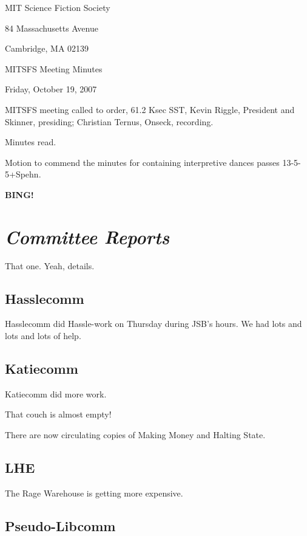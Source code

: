 \documentclass[10pt]{article}
\newcommand{\bing}{{\bf BING!} }
\newcommand{\goto}[1]{\bing \vskip 12pt \section*{{\em{#1}}}}
\begin{document}
\begin{center}

MIT Science Fiction Society

84 Massachusetts Avenue

Cambridge, MA 02139

\vspace{12pt}

MITSFS Meeting Minutes

Friday, October 19, 2007

\end{center}

\vspace{18pt}

\setlength{\parskip}{6pt}

\noindent
MITSFS meeting called to order, 61.2 Ksec SST,
Kevin Riggle, President and Skinner, presiding; Christian Ternus, Onseck, recording.

Minutes read.

Motion to commend the minutes for containing interpretive dances passes 13-5-5+Spehn.

\BING

\goto{Committee Reports}

That one.  Yeah, details.

\subsection*{Hasslecomm}

Hasslecomm did Hassle-work on Thursday during JSB's hours.  We had lots and lots and lots of help.

\subsection*{Katiecomm}

Katiecomm did more work.

That couch is almost empty!  

There are now circulating copies of Making Money and Halting State.

\subsection*{LHE}

The Rage Warehouse is getting more expensive.

\subsection*{Pseudo-Libcomm}
\end{document}
